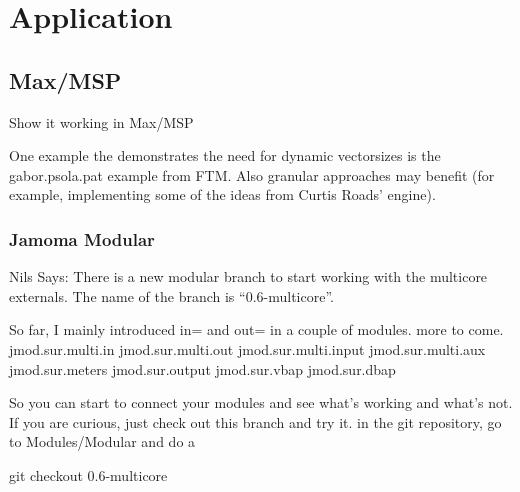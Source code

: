 \documentclass[twoside,a4paper]{article}
\begin{document}






\section{Application} %

\subsection{Max/MSP} %

Show it working in Max/MSP

One example the demonstrates the need for dynamic vectorsizes is the gabor.psola.pat example from FTM. Also granular approaches may benefit (for example, implementing some of the ideas from Curtis Roads' engine).


\subsubsection{Jamoma Modular} %


Nils Says:
There is a new modular branch to start working with the multicore 
externals. The name of the branch is ``0.6-multicore''.

So far, I mainly introduced in= and out= in a couple of modules. more to come.
jmod.sur.multi.in
jmod.sur.multi.out
jmod.sur.multi.input
jmod.sur.multi.aux
jmod.sur.meters
jmod.sur.output
jmod.sur.vbap
jmod.sur.dbap


So you can start to connect your modules and see what's working and 
what's not.
If you are curious, just check out this branch and try it.
in the git repository, go to Modules/Modular and do a

git checkout 0.6-multicore

\end{document}
